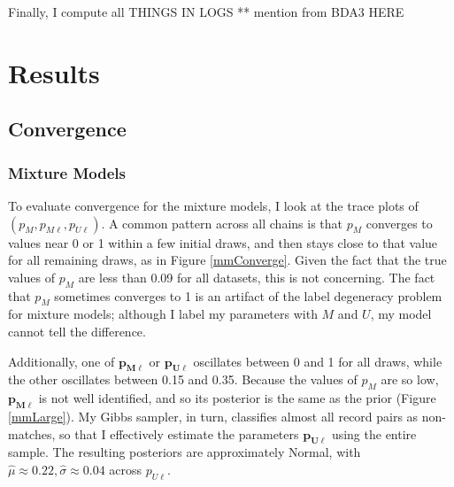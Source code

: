 \documentclass[11pt,reqno]{amsart}
\newcommand\params{(p_M, p_{M\ell}, p_{U\ell})}
\begin{document}
Finally, I compute all THINGS IN LOGS ** mention from BDA3 HERE

\section{Results}

\subsection{Convergence}
\subsubsection{Mixture Models} 
To evaluate convergence for the mixture models, I look at the trace plots of $\params$.  A common pattern across all chains is that $p_M$ converges to values near 0 or 1 within a few initial draws, and then stays close to that value for all remaining draws, as in Figure \ref{mmConverge}.  Given the fact that the true values of $p_M$ are less than 0.09 for all datasets, this is not concerning.  The fact that $p_M$ sometimes converges to 1 is an artifact of the label degeneracy problem for mixture models; although I label my parameters with $M$ and $U$, my model cannot tell the difference.

Additionally, one of $\mathbf{p_{M\ell}}$ or $\mathbf{p_{U\ell}}$ oscillates between 0 and 1 for all draws, while the other oscillates between 0.15 and 0.35.  Because the values of $p_M$ are so low, $\mathbf{p_{M\ell}}$ is not well identified, and so its posterior is the same as the prior (Figure \ref{mmLarge}).  My Gibbs sampler, in turn, classifies almost all record pairs as non-matches, so that I effectively estimate the parameters $\mathbf{p_{U\ell}}$ using the entire sample. The resulting posteriors are approximately Normal, with $\hat{\mu} \approx 0.22,  \hat{\sigma} \approx 0.04$ across $p_{U\ell}$.
 
\end{document}
